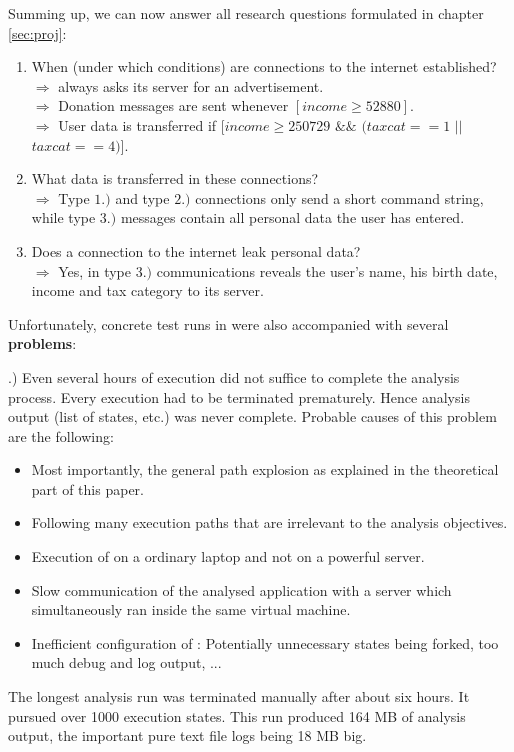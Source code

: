 Summing up, we can now answer all research questions formulated in chapter \ref{sec:proj}:
\begin{enumerate}
  \item When (under which conditions) are connections to the internet established?\\
$\Rightarrow$ \app always asks its server for an advertisement.\\
$\Rightarrow$ Donation messages are sent whenever $[income \ge 52880]$.\\
$\Rightarrow$ User data is transferred if $[income \ge 250729$ $\&\&$ $(taxcat == 1$ $||$ $taxcat == 4)]$.
  \item What data is transferred in these connections?\\
$\Rightarrow$ Type $1.)$ and type $2.)$ connections only send a short command string, while type $3.)$ messages contain all personal data the user has entered.
  \item Does a connection to the internet leak personal data?\\
$\Rightarrow$ Yes, in type $3.)$ communications \app reveals the user's name, his birth date, income and tax category to its server.
\end{enumerate}



\bigskip



Unfortunately, concrete test runs in \sse were also accompanied with several \textbf{problems}:

.) Even several hours of execution did not suffice to complete the analysis process.
Every execution had to be terminated prematurely.
Hence analysis output (list of states, etc.) was never complete.
Probable causes of this problem are the following: 
\begin{itemize}
\item Most importantly, the general path explosion as explained in the theoretical part of this paper.
\item Following many execution paths that are irrelevant to the analysis objectives.
\item Execution of \sse on a ordinary laptop and not on a powerful server.
\item Slow communication of the analysed application with a server which simultaneously ran inside the same virtual machine.
\item Inefficient configuration of \sse: Potentially unnecessary states being forked, too much debug and log output, ...
\end{itemize}
The longest analysis run was terminated manually after about six hours.
It pursued over 1000 execution states.
This run produced 164 MB of analysis output, the important pure text file logs being 18 MB big.


